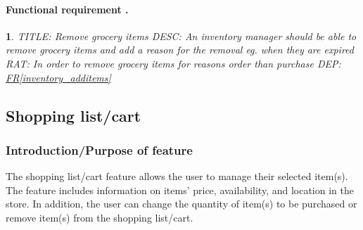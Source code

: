 \documentclass{scrreprt}
\newcounter{funcreq}
\theoremstyle{funreq}
\newtheorem{funreq}{}
\newcommand*{\reqref}[1]{\hyperref[#1]{FR\ref*{#1}}}
\begin{document}
\paragraph[]{Functional requirement .}
\begin{funreq}
	
	\label{inventory_remove}
	TITLE: Remove grocery items
	DESC: An inventory manager should be able to remove grocery items and add a reason for the removal eg. when they are expired
	RAT: In order to remove grocery items for reasons order than purchase
	DEP: \reqref{inventory_additems}
\end{funreq}

%	


\subsection{Shopping list/cart}
\subsubsection{Introduction/Purpose of feature}
The shopping list/cart feature allows the user to manage their selected item(s). The feature includes information on items’ price, availability, and location in the store. In addition, the user can change the quantity of item(s) to be purchased or remove item(s) from the shopping list/cart.
\end{document}
